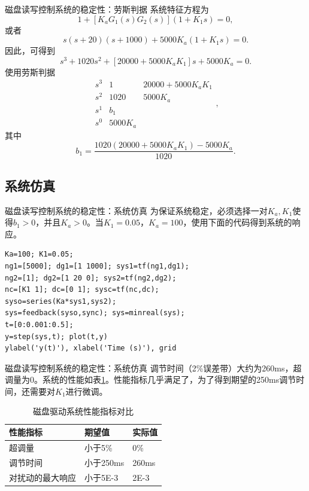 \documentclass[handout,cjkutf8,table,aspectratio=1610]{beamer} %
\begin{document}
\begin{frame}{磁盘读写控制系统的稳定性：劳斯判据}
\vspace{-.5em}
系统特征方程为
$$1+[K_aG_1(s)G_2(s)](1+K_1s)=0,$$
或者
$$s(s+20)(s+1000)+5000K_a(1+K_1s)=0.$$
因此，可得到
$$s^3+1020s^2+[20000+5000K_aK_1]s+5000K_a=0.$$
使用劳斯判据
$$
\begin{array}{l|cc}
s^3&1&20000+5000K_aK_1\\
s^2&1020&5000K_a\\
s^1&b_1&\\
s^0&5000K_a& 
\end{array},
$$
其中
$$b_1=\frac{1020(20000+5000K_aK_1)-5000K_a}{1020}.$$
\end{frame}

\subsection{系统仿真}
\begin{frame}[fragile]{磁盘读写控制系统的稳定性：系统仿真}
为保证系统稳定，必须选择一对$K_a,K_1$使得$b_1>0$，并且$K_a>0$。当$K_1=0.05$，$K_a=100$，使用下面的代码得到系统的响应。
\begin{verbatim}
Ka=100; K1=0.05;
ng1=[5000]; dg1=[1 1000]; sys1=tf(ng1,dg1);
ng2=[1]; dg2=[1 20 0]; sys2=tf(ng2,dg2);
nc=[K1 1]; dc=[0 1]; sysc=tf(nc,dc);
syso=series(Ka*sys1,sys2);
sys=feedback(syso,sync); sys=minreal(sys);
t=[0:0.001:0.5];
y=step(sys,t); plot(t,y)
ylabel('y(t)'), xlabel('Time (s)'), grid
\end{verbatim} 

\end{frame}

\begin{frame}{磁盘读写控制系统的稳定性：系统仿真}
调节时间（2\%误差带）大约为260ms，超调量为0。系统的性能如表\ref{tab:4}。性能指标几乎满足了，为了得到期望的250ms调节时间，还需要对$K_1$进行微调。
\begin{table}
\caption{磁盘驱动系统性能指标对比}
\begin{tabular}{lll}\toprule
性能指标&期望值&实际值\\\midrule
超调量&小于5\%&0\%\\
调节时间&小于250ms&260ms\\
对扰动的最大响应&小于5E-3&2E-3\\\bottomrule 
\end{tabular}
\label{tab:4} 
\end{table}
\end{frame}
\end{document}
